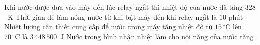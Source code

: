 \begin{ex}
\begin{center}
\begin{tikzpicture}[scale=0.691,line join=round,line cap=round,font=\footnotesize]
			\end{tikzpicture}
		\end{center}
		\choiceTFt
		{Khi nước được đưa vào máy đến lúc relay ngắt thì nhiệt độ của nước đã tăng $328$~K}
		{Thời gian để làm nóng nước từ khi bật máy đến khi relay ngắt là $10$ phút}
		{\True Nhiệt lượng cần thiết cung cấp để nước trong máy tăng nhiệt độ từ $15\,^\circ\text{C}$ lên $70\,^\circ\text{C}$ là $3\,448\,500$~J}
		{\True Nước trong bình nhận nhiệt làm cho nội năng của nước tăng}
	\end{ex}

